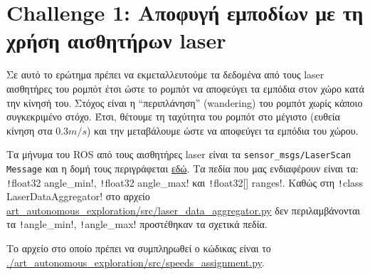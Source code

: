 \section{Challenge 1: Αποφυγή εμποδίων με τη χρήση αισθητήρων laser}\label{section:ex1}
Σε αυτό το ερώτημα πρέπει να εκμεταλλευτούμε τα δεδομένα από τους laser αισθητήρες του ρομπότ έτσι ώστε το ρομπότ να αποφεύγει τα εμπόδια στον χώρο κατά την κίνησή του.
Στόχος είναι η ``περιπλάνηση'' (wandering) του ρομπότ χωρίς κάποιο συγκεκριμένο στόχο.
Έτσι, θέτουμε τη ταχύτητα του ρομπότ στο μέγιστο (ευθεία κίνηση στα $0.3 m/s$) και την μεταβάλουμε ώστε να αποφεύγει τα εμπόδια του χώρου.

\sloppy Τα μήνυμα του ROS από τους αισθητήρες laser είναι τα \texttt{sensor\_msgs/LaserScan Message} και η δομή τους περιγράφεται
\href{http://docs.ros.org/api/sensor_msgs/html/msg/LaserScan.html}{εδώ}.
Τα πεδία που μας ενδιαφέρουν είναι τα:
\texttt!float32 angle_min!, \texttt!float32 angle_max! και \texttt!float32[] ranges!.
Καθώς στη \texttt!class LaserDataAggregator! στο αρχείο \url{art_autonomous_exploration/src/laser_data_aggregator.py} δεν περιλαμβάνονται τα \texttt!angle_min!, \texttt!angle_max! προστέθηκαν τα σχετικά πεδία.

Το αρχείο στο οποίο πρέπει να συμπληρωθεί ο κώδικας είναι το
\url{./art_autonomous_exploration/src/speeds_assignment.py}.

